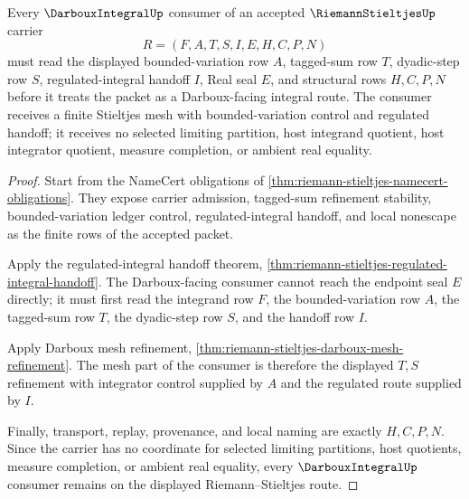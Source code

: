 \begin{theorem}
\label{thm:riemann-stieltjes-darboux-integral-consumer-route}
Every $\DarbouxIntegralUp$ consumer of an accepted $\RiemannStieltjesUp$ carrier
$$
R=(F,A,T,S,I,E,H,C,P,N)
$$
must read the displayed bounded-variation row $A$, tagged-sum row $T$, dyadic-step row $S$, regulated-integral handoff $I$, Real seal $E$, and structural rows $H,C,P,N$ before it treats the packet as a Darboux-facing integral route. The consumer receives a finite Stieltjes mesh with bounded-variation control and regulated handoff; it receives no selected limiting partition, host integrand quotient, host integrator quotient, measure completion, or ambient real equality.
\end{theorem}
\begin{proof}
Start from the NameCert obligations of \autoref{thm:riemann-stieltjes-namecert-obligations}. They expose carrier admission, tagged-sum refinement stability, bounded-variation ledger control, regulated-integral handoff, and local nonescape as the finite rows of the accepted packet.

Apply the regulated-integral handoff theorem, \autoref{thm:riemann-stieltjes-regulated-integral-handoff}. The Darboux-facing consumer cannot reach the endpoint seal $E$ directly; it must first read the integrand row $F$, the bounded-variation row $A$, the tagged-sum row $T$, the dyadic-step row $S$, and the handoff row $I$.

Apply Darboux mesh refinement, \autoref{thm:riemann-stieltjes-darboux-mesh-refinement}. The mesh part of the consumer is therefore the displayed $T,S$ refinement with integrator control supplied by $A$ and the regulated route supplied by $I$.

Finally, transport, replay, provenance, and local naming are exactly $H,C,P,N$. Since the carrier has no coordinate for selected limiting partitions, host quotients, measure completion, or ambient real equality, every $\DarbouxIntegralUp$ consumer remains on the displayed Riemann--Stieltjes route.
\end{proof}

